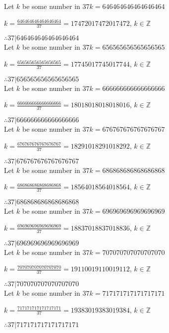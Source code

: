 \documentclass{article}
\begin{document}
Let $k$ be some number in $37k = 646464646464646464$

$k = \frac{646464646464646464}{37} = 17472017472017472$, $k \in \mathbb{Z}$

$ \therefore  37|646464646464646464 $ \\

Let $k$ be some number in $37k = 656565656565656565$

$k = \frac{656565656565656565}{37} = 17745017745017744$, $k \in \mathbb{Z}$

$ \therefore  37|656565656565656565 $ \\

Let $k$ be some number in $37k = 666666666666666666$

$k = \frac{666666666666666666}{37} = 18018018018018016$, $k \in \mathbb{Z}$

$ \therefore  37|666666666666666666 $ \\

Let $k$ be some number in $37k = 676767676767676767$

$k = \frac{676767676767676767}{37} = 18291018291018292$, $k \in \mathbb{Z}$

$ \therefore  37|676767676767676767 $ \\

Let $k$ be some number in $37k = 686868686868686868$

$k = \frac{686868686868686868}{37} = 18564018564018564$, $k \in \mathbb{Z}$

$ \therefore  37|686868686868686868 $ \\

Let $k$ be some number in $37k = 696969696969696969$

$k = \frac{696969696969696969}{37} = 18837018837018836$, $k \in \mathbb{Z}$

$ \therefore  37|696969696969696969 $ \\

Let $k$ be some number in $37k = 707070707070707070$

$k = \frac{707070707070707070}{37} = 19110019110019112$, $k \in \mathbb{Z}$

$ \therefore  37|707070707070707070 $ \\

Let $k$ be some number in $37k = 717171717171717171$

$k = \frac{717171717171717171}{37} = 19383019383019384$, $k \in \mathbb{Z}$

$ \therefore  37|717171717171717171 $ \\
\end{document}
